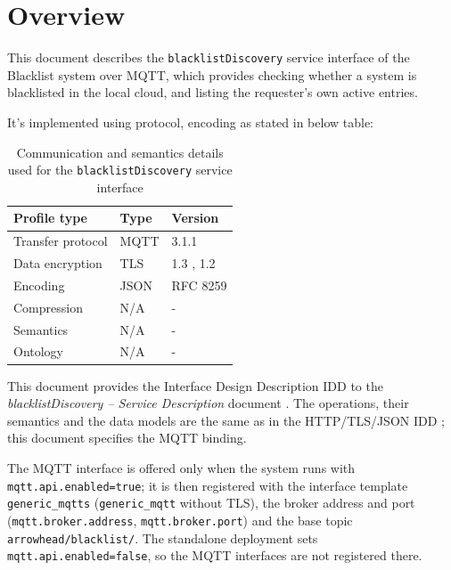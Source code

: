 \documentclass[a4paper]{arrowhead}
\begin{document}
\section{Overview}
\label{sec:overview}

This document describes the \texttt{blacklistDiscovery} service interface of the Blacklist system over MQTT, which provides checking whether a system is blacklisted in the local cloud, and listing the requester's own active entries.

It's implemented using protocol, encoding as stated in below table:
\begin{table}[ht!]
  \centering
  \begin{tabular}{|l|l|l|}
    \hline
    \rowcolor{gray!33} Profile type & Type & Version \\ \hline
    Transfer protocol & MQTT & 3.1.1 \cite{mqtt311} \\ \hline
    Data encryption & TLS & 1.3 \cite{rfc8446}, 1.2 \cite{rfc5246} \\ \hline
    Encoding & JSON & RFC 8259 \cite{rfc8259} \\ \hline
    Compression & N/A & - \\ \hline
    Semantics & N/A & - \\ \hline
    Ontology & N/A & - \\ \hline
  \end{tabular}
  \caption{Communication and semantics details used for the \texttt{blacklistDiscovery} service interface}
  \label{tab:comunication_semantics_profile}
\end{table}

This document provides the Interface Design Description IDD to the \textit{blacklistDiscovery -- Service Description} document \cite{bl-blacklistDiscovery-sd}.
The operations, their semantics and the data models are the same as in the HTTP/TLS/JSON IDD \cite{bl-blacklistDiscovery-http-idd}; this document specifies the MQTT binding.

The MQTT interface is offered only when the system runs with \texttt{mqtt.api.enabled=true}; it is then registered with the interface template \texttt{generic\_\allowbreak{}mqtts} (\texttt{generic\_\allowbreak{}mqtt} without TLS), the broker address and port (\texttt{mqtt.\allowbreak{}broker.\allowbreak{}address}, \texttt{mqtt.\allowbreak{}broker.\allowbreak{}port}) and the base topic \texttt{arrowhead/\allowbreak{}blacklist/\allowbreak{}}. The standalone deployment sets \texttt{mqtt.\allowbreak{}api.\allowbreak{}enabled=\allowbreak{}false}, so the MQTT interfaces are not registered there.
\end{document}
